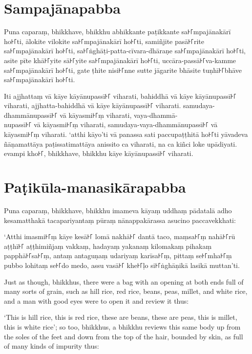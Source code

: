 \paliPage
\section*{Sampajānapabba}

Puna caparaṃ, bhikkhave, bhikkhu abhikkante paṭikkante sa꜔꜒mpajānakārī ho꜔꜒ti,
ālokite vilokite sa꜔꜒mpajānakārī ho꜔꜒ti, samiñjite pasā꜔꜒rite sa꜔꜒mpajānakārī ho꜔꜒ti,
sa꜔꜒ṅghāṭi-patta-cīvara-dhāraṇe sa꜔꜒mpajānakārī ho꜔꜒ti, asite pīte khā꜔꜒yite sā꜔꜒yite
sa꜔꜒mpajānakārī ho꜔꜒ti, uccāra-passā꜔꜒va-kamme sa꜔꜒mpajānakārī ho꜔꜒ti, gate ṭhite nisi꜔꜒nne
sutte jāgarite bhāsite tuṇhī꜔꜒bhāve sa꜔꜒mpajānakārī ho꜔꜒ti.

Iti ajjhattaṃ vā kāye kāyānupassī꜔꜒ viharati, bahiddhā vā kāye kāyānupassī꜔꜒
viharati, ajjhatta-bahiddhā vā kāye kāyānupassī꜔꜒ viharati. samudaya-dhammānupassī꜔꜒
vā kāyasmi꜔꜒ṃ viharati, vaya-dhammā-\\
nupassī꜔꜒ vā kāyasmi꜔꜒ṃ viharati, samudaya-vaya-dhammānupassī꜔꜒ vā kāyasmi꜔꜒ṃ viharati.
‘atthi kāyo’ti vā panassa sati paccupaṭṭhitā ho꜔꜒ti yāvadeva ñāṇamattāya
paṭissatimattāya anissito ca viharati, na ca kiñci loke upādiyati. evampi kho꜔꜒,
bhikkhave, bhikkhu kāye kāyānupassī꜔꜒ viharati.


\section*{Paṭikūla-manasikārapabba}

Puna caparaṃ, bhikkhave, bhikkhu imameva kāyaṃ uddhaṃ pādatalā adho kesamatthakā
tacapariyantaṃ pūraṃ nānappakārassa asucino paccavekkhati:

‘Atthi imasmi꜔꜒ṃ kāye kesā꜔꜒ lomā nakhā꜔꜒ dantā taco, maṃsa꜔꜒ṃ nahā꜔꜒rū aṭṭhī꜔꜒ aṭṭhimiñjaṃ
vakkaṃ, hadayaṃ yakanaṃ kilomakaṃ pihakaṃ papphā꜔꜒sa꜔꜒ṃ, antaṃ antaguṇaṃ udariyaṃ
karīsa꜔꜒ṃ, pittaṃ se꜔꜒mha꜔꜒ṃ pubbo lohitaṃ se꜔꜒do medo, assu vasā꜔꜒ khe꜔꜒ḷo si꜔꜒ṅghāṇikā
lasikā muttan’ti.

\englishPage

Just as though, bhikkhus, there were a bag with an opening at both ends full of
many sorts of grain, such as hill rice, red rice, beans, peas, millet, and white
rice, and a man with good eyes were to open it and review it thus:

‘This is hill rice, this is red rice, these are beans, these are peas, this is
millet, this is white rice’; so too, bhikkhus, a bhikkhu reviews this same body
up from the soles of the feet and down from the top of the hair, bounded by
skin, as full of many kinds of impurity thus:

